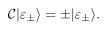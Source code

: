 \begin{equation}
{\cal C}|\varepsilon_{\pm}\rangle=\pm |\varepsilon_{\pm}\rangle.
\label{e24}
\end{equation}

